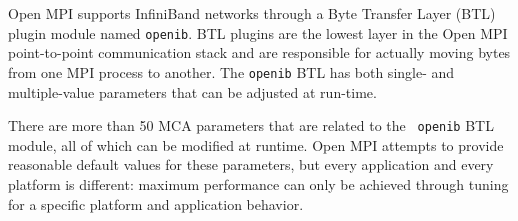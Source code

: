 \label{sec:motivation}

Open MPI supports InfiniBand networks through a Byte Transfer Layer
(BTL) plugin module named {\tt openib}.  BTL plugins are the lowest
layer in the Open MPI point-to-point communication stack and are
responsible for actually moving bytes from one MPI process to
another.  The {\tt openib} BTL has both single- and multiple-value
parameters that can be adjusted at run-time.


There are more than 50 MCA parameters that are related to the {\tt
  openib} BTL module, all of which can be modified at runtime.  Open
MPI attempts to provide reasonable default values for these
parameters, but every application and every platform is different:
maximum performance can only be achieved through tuning for a specific
platform and application behavior.

%


